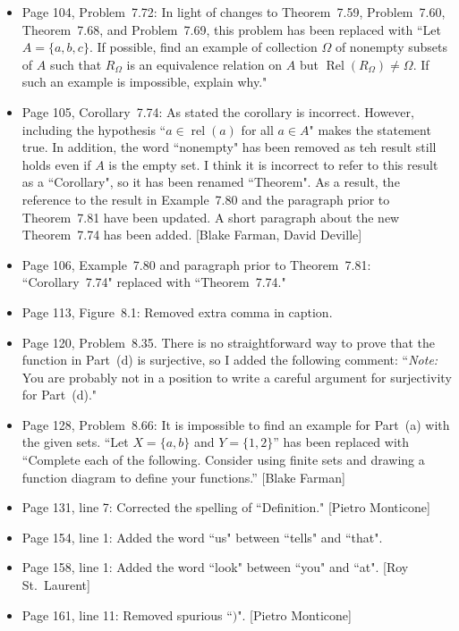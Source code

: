 \documentclass[11pt]{article}%
\DeclareMathOperator{\rel}{rel}
\newcommand{\Rel}{\operatorname{Rel}}
\begin{document}
\begin{itemize}
\item Page 104, Problem~7.72: In light of changes to Theorem~7.59, Problem~7.60, Theorem~7.68, and Problem~7.69, this problem has been replaced  with ``Let $A=\{a,b,c\}$. If possible, find an example of collection $\Omega$ of nonempty subsets of $A$ such that $R_{\Omega}$ is an equivalence relation on $A$ but $\Rel(R_{\Omega})\neq \Omega$.  If such an example is impossible, explain why."
\item Page 105, Corollary~7.74: As stated the corollary is incorrect. However, including the hypothesis ``$a\in\rel(a)$ for all $a\in A$" makes the statement true. In addition, the word ``nonempty" has been removed as teh result still holds even if $A$ is the empty set. I think it is incorrect to refer to this result as a ``Corollary", so it has been renamed ``Theorem". As a result, the reference to the result in Example~7.80 and the paragraph prior to Theorem~7.81 have been updated. A short paragraph about the new Theorem~7.74 has been added. [Blake Farman, David Deville]
\item Page 106, Example~7.80 and paragraph prior to Theorem~7.81: ``Corollary~7.74" replaced with ``Theorem~7.74."
\item Page 113, Figure~8.1: Removed extra comma in caption.
\item Page 120, Problem~8.35. There is no straightforward way to prove that the function in Part~(d) is surjective, so I added the following comment: ``\emph{Note:} You are probably not in a position to write a careful argument for surjectivity for Part~(d)."  
\item Page 128, Problem~8.66: It is impossible to find an example for Part~(a) with the given sets.  ``Let $X=\{a,b\}$ and $Y=\{1,2\}$'' has been replaced with ``Complete each of the following. Consider using finite sets and drawing a function diagram to define your functions.'' [Blake Farman]
\item Page 131, line 7: Corrected the spelling of ``Definition." [Pietro Monticone]
\item Page 154, line 1: Added the word ``us" between ``tells" and ``that".
\item Page 158, line 1: Added the word ``look" between ``you" and ``at". [Roy St.~Laurent]
\item Page 161, line 11: Removed spurious ``$)$". [Pietro Monticone]
\end{itemize}
\end{document}
